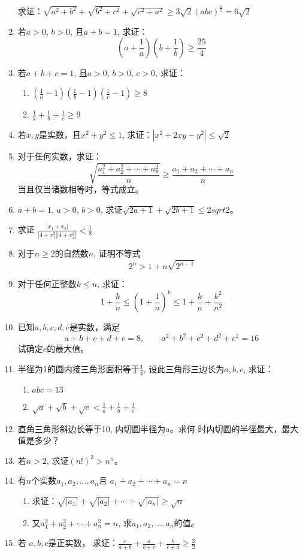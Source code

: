 \begin{enumerate}
求证：$\sqrt{a^2+b^2}+\sqrt{b^2+c^2}+\sqrt{c^2+a^2}\ge 3\sqrt{2}(abc)^{\tfrac{1}{3}}=6\sqrt{2}$

\item 若$a>0$, $b>0$, 且$a+b=1$, 
求证：\[\left(a+\frac{1}{a}\right)\left(b+\frac{1}{b}\right)\ge \frac{25}{4}\]

\item 若$a+b+c=1$, 且$a>0$, $b>0$, $c>0$, 求证：
\begin{enumerate}
    \item $\left(\frac{1}{a}-1\right)\left(\frac{1}{b}-1\right)\left(\frac{1}{c}-1\right)\ge 8$
    \item $\frac{1}{a}+\frac{1}{b}+\frac{1}{c}\ge 9$
\end{enumerate}

\item 若$x,y$是实数，且$x^2+y^2\le 1$,
求证：$|x^2+2xy-y^2|\le \sqrt{2}$

\item 对于任何实数，求证：
\[\sqrt{\frac{a_1^2+a_2^2+\cdots+a_n^2}{n}}\ge \frac{a_1+a_2+\cdots+a_n}{n}\]
当且仅当诸数相等时，等式成立。
\item $a+b=1$, $a>0$, $b>0$, 求证$\sqrt{2a+1}+\sqrt{2b+1}\le 2sqrt{2}$。
\item 求证
$\frac{|x_1+x_2|}{|4+x_1^2| |4+x_2^2|}<\frac{1}{8}$
\item 对于$n\ge 2$的自然数$n$, 证明不等式
$$2^n>1+n\sqrt{2^{n-1}}$$
\item 对于任何正整数$k\le n$, 求证：
\[1+\frac{k}{n}\le \left(1+\frac{1}{n}\right)^k\le 1+\frac{k}{n}+\frac{k^2}{n^2}\]
\item 已知$a,b,c,d,e$是实数，满足
\[a+b+c+d+e=8,\qquad a^2+b^2+c^2+d^2+e^2=16\]
试确定$e$的最大值。
\item 半径为1的圆内接三角形面积等于$\frac{1}{4}$,
设此三角形三边长为$a,b,c$, 求证：
\begin{enumerate}
    \item $abc=13$
    \item $\sqrt{a}+\sqrt{b}+\sqrt{c}<\frac{1}{a}+\frac{1}{b}+\frac{1}{c}$
\end{enumerate}

\item 直角三角形斜边长等于10, 内切圆半径为$a$。求何
时内切圆的半径最大，最大值是多少？
\item 若$n>2$, 求证$(n!)^2>n^n$。
\item 有$n$个实数$a_1,a_2,\ldots,a_n$且
$a_1+a_2+\cdots+a_n=n$
\begin{enumerate}
    \item 求证：$\sqrt{|a_1|}+\sqrt{|a_2|}+\cdots+\sqrt{|a_n|}\ge \sqrt{n}$
    \item 又$a^2_1+a_2^2+\cdots+a^2_n=n$, 
求$a_1,a_2,\ldots,a_n$的值。
\end{enumerate}

\item 若 $a,b,c$是正实数，
求证：$\frac{c}{a+b}+\frac{a}{b+c}+\frac{b}{c+a}\ge \frac{3}{2}$
\end{enumerate}


